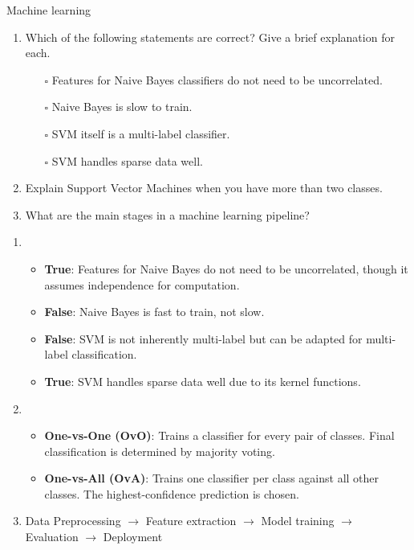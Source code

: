 \documentclass{article}
\begin{document}
\begin{exercise}{Machine learning}\label{ex:ml}
  \begin{enumerate}
    \item Which of the following statements are correct? Give a brief explanation for each.
      \begin{itemize}
        \item[$\square$] Features for Naive Bayes classifiers do not need to be uncorrelated.
        \item[$\square$] Naive Bayes is slow to train.
        \item[$\square$] SVM itself is a multi-label classifier.
        \item[$\square$] SVM handles sparse data well.
      \end{itemize}
      \item Explain Support Vector Machines when you have more than two classes.
      \item What are the main stages in a machine learning pipeline?
  \end{enumerate}

  \begin{solution}
    \begin{enumerate}
      \item \begin{itemize}
          \item \textbf{True}: Features for Naive Bayes do not need to be uncorrelated, though it assumes independence for computation.
          \item \textbf{False}: Naive Bayes is fast to train, not slow.
          \item \textbf{False}: SVM is not inherently multi-label but can be adapted for multi-label classification.
          \item \textbf{True}: SVM handles sparse data well due to its kernel functions.
        \end{itemize}
      \item \begin{itemize}
          \item \textbf{One-vs-One (OvO)}: Trains a classifier for every pair of classes. Final classification is determined by majority voting.
          \item \textbf{One-vs-All (OvA)}: Trains one classifier per class against all other classes. The highest-confidence prediction is chosen.
        \end{itemize}
      \item Data Preprocessing $\to$ Feature extraction $\to$ Model training $\to$ Evaluation $\to$ Deployment
    \end{enumerate}
  \end{solution}
\end{exercise}
\end{document}
